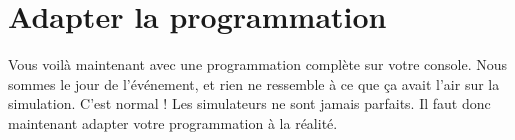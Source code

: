 \chapter{Adapter la programmation}
\label{chap:adapter_la_programmation}

Vous voilà maintenant avec une programmation complète sur votre console.
Nous sommes le jour de l'événement, et rien ne ressemble à ce que ça avait l'air sur la simulation.
C'est normal ! Les simulateurs ne sont jamais parfaits.
Il faut donc maintenant adapter votre programmation à la réalité.





